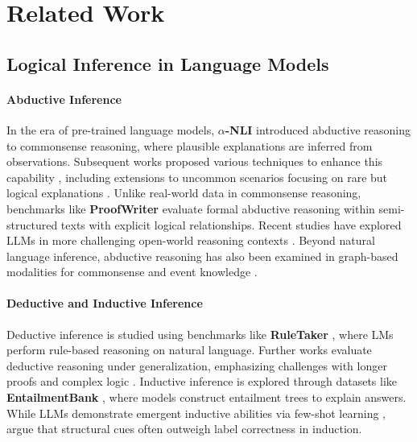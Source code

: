 \section{Related Work}
\subsection{Logical Inference in Language Models}
\paragraph{Abductive Inference}
In the era of pre-trained language models, $\alpha$\textbf{-NLI} \citep{bhagavatula2020abductivecommonsensereasoning} introduced abductive reasoning to commonsense reasoning, where plausible explanations are inferred from observations. Subsequent works proposed various techniques to enhance this capability \citep{qin2021futureunsupervisedbackpropbaseddecoding, kadiķis2022embarrassinglysimpleperformanceprediction, chan2023selfconsistentnarrativepromptsabductive}, including extensions to uncommon scenarios focusing on rare but logical explanations \citep{zhao2024uncommonsensereasoningabductivereasoning}. Unlike real-world data in commonsense reasoning, benchmarks like \textbf{ProofWriter} \citep{tafjord2021proofwritergeneratingimplicationsproofs} evaluate formal abductive reasoning within semi-structured texts with explicit logical relationships. Recent studies have explored LLMs in more challenging open-world reasoning contexts \citep{zhong2023chatablabductivelearningnatural, del2023truedetectivedeepabductive, thagard2024chatgptmakeexplanatoryinferences}. Beyond natural language inference, abductive reasoning has also been examined in graph-based modalities for commonsense and event knowledge \citep{du-etal-2021-learning, bai2024advancingabductivereasoningknowledge}.

\paragraph{Deductive and Inductive Inference}
Deductive inference is studied using benchmarks like \textbf{RuleTaker} \citep{clark2020transformerssoftreasonerslanguage}, where LMs perform rule-based reasoning on natural language. Further works evaluate deductive reasoning under generalization, emphasizing challenges with longer proofs \cite{saparov2023testinggeneraldeductivereasoning} and complex logic \cite{zheng2025enhancingtransformersgeneralizablefirstorder}. Inductive inference is explored through datasets like \textbf{EntailmentBank} \citep{dalvi2022explaininganswersentailmenttrees}, where models construct entailment trees to explain answers. While LLMs demonstrate emergent inductive abilities via few-shot learning \citep{wei2022emergentabilitieslargelanguage}, \citet{min2022rethinkingroledemonstrationsmakes} argue that structural cues often outweigh label correctness in induction.

